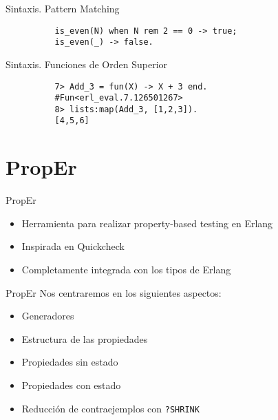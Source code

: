 \documentclass{beamer}
\begin{document}
      \begin{frame}[fragile]{Sintaxis. Pattern Matching}
        \begin{verbatim}
          is_even(N) when N rem 2 == 0 -> true;
          is_even(_) -> false.
        \end{verbatim}
      \end{frame}

      \begin{frame}[fragile]{Sintaxis. Funciones de Orden Superior}
        \begin{verbatim}
          7> Add_3 = fun(X) -> X + 3 end.
          #Fun<erl_eval.7.126501267>
          8> lists:map(Add_3, [1,2,3]).
          [4,5,6]
        \end{verbatim}
      \end{frame}

  \section{PropEr}
    \begin{frame}{PropEr}
      \begin{itemize}
        \item Herramienta para realizar property-based testing en Erlang
        \item Inspirada en Quickcheck
        \item Completamente integrada con los tipos de Erlang
      \end{itemize}
    \end{frame}

    \begin{frame}{PropEr}
      Nos centraremos en los siguientes aspectos:
      \begin{itemize}
        \item Generadores
        \item Estructura de las propiedades
        \item Propiedades sin estado
        \item Propiedades con estado
        \item Reducción de contraejemplos con \texttt{?SHRINK}
      \end{itemize}
    \end{frame}
\end{document}
